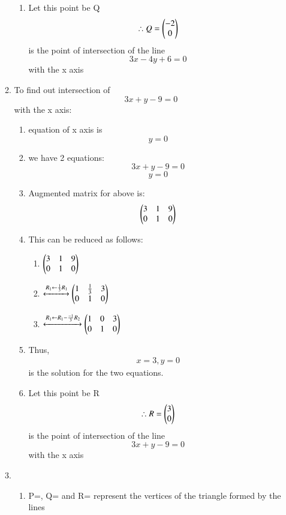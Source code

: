 \documentclass[journal,12pt,twocolumn]{IEEEtran}
\renewcommand\thesection{\arabic{section}}
\begin{document}
\begin{enumerate}[label=\thesection.\arabic*.,ref=\thesection.\theenumi]
\begin{enumerate}
\begin{enumerate}
\item  Let this point be Q
\begin{align}
\therefore Q=\begin{pmatrix}-2\\0\end{pmatrix}
\end{align}
is the point of intersection of the line \[3x-4y+6=0\] with the x axis
\end{enumerate}
\item To find out intersection of \[3x+y-9=0\] with the x axis:
\begin{enumerate}
    \item equation of x axis is \[y=0\]
    \item we have 2 equations: \[3x+y-9=0\] \[y=0\]
    \item Augmented matrix for above is:
\begin{align}
    \begin{pmatrix}3 & 1 & 9\\
           0 & 1 & 0\end{pmatrix}
\end{align}
\item This can be reduced as follows:
\begin{enumerate}
    \item $\begin{pmatrix}3 & 1 & 9\\
           0 & 1 & 0\end{pmatrix}$
    \item $\xleftrightarrow {R_1 \leftarrow \frac{1}{3}R_1}
    \begin{pmatrix}1 & \frac{1}{3} & 3\\
          0 & 1 & 0\end{pmatrix}\\$
          \item $\xleftrightarrow{R_1 \leftarrow R_1 - \frac{-1}{3}R_2}
    \begin{pmatrix}1 &0&3\\
        0&1&0\end{pmatrix}\\$
\end{enumerate}
\item Thus,
\begin{align}
    x=3, y=0
\end{align} 
is the solution for the two equations. 
\item  Let this point be R
\begin{align}
\therefore R=\begin{pmatrix}3\\0\end{pmatrix}
\end{align}
is the point of intersection of the line \[3x+y-9=0\] with the x axis
\end{enumerate}
\item 
\begin{enumerate}
    \item P=, Q= and R= represent the vertices of the triangle formed by the lines \\

\end{enumerate}
\end{enumerate}
\end{enumerate}
\end{document}
